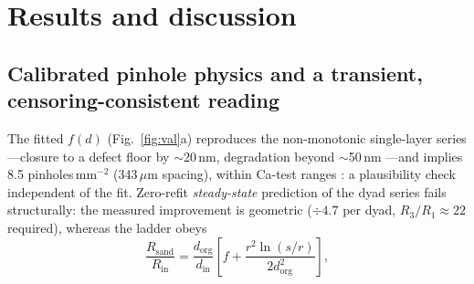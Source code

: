 \documentclass[11pt]{article}
\newcommand{\dorg}{d_{\mathrm{org}}}
\newcommand{\din}{d_{\mathrm{in}}}
\begin{document}
\section{Results and discussion}
\subsection{Calibrated pinhole physics and a transient, censoring-consistent reading}\label{sec:val}
The fitted $f(d)$ (Fig.~\ref{fig:val}a) reproduces the non-monotonic single-layer series---closure to a defect floor by $\sim$20\,nm, degradation beyond $\sim$50\,nm \cite{wu2018}---and implies 8.5 pinholes\,mm$^{-2}$ (343\,$\mu$m spacing), within Ca-test ranges \cite{dasilva2000,carcia2006}: a plausibility check independent of the fit. Zero-refit \emph{steady-state} prediction of the dyad series fails structurally: the measured improvement is geometric ($\div4.7$ per dyad, $R_3/R_1\approx22$ required), whereas the ladder obeys
\begin{equation}
\frac{R_{\mathrm{sand}}}{R_{\mathrm{in}}}=\frac{\dorg}{\din}\left[f+\frac{r^{2}\ln(s/r)}{2\dorg^{2}}\right],
\end{equation}
\end{document}
